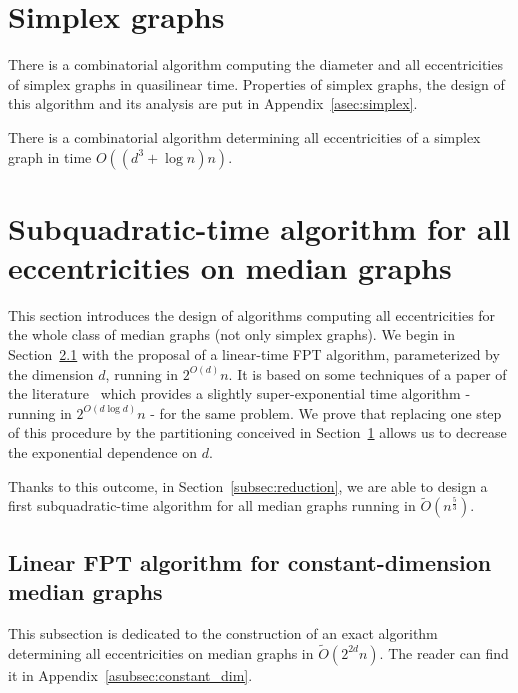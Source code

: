 \documentclass[a4paper,UKenglish,numberwithinsect,cleveref, autoref,anonymous]{lipics-v2021}
\begin{document}

\section{Simplex graphs} \label{sec:simplex}

There is a combinatorial algorithm computing the diameter and all eccentricities of simplex graphs in quasilinear time. Properties of simplex graphs, the design of this algorithm and its analysis are put in Appendix~\ref{asec:simplex}.

\begin{theorem}[\ref{co:linear_simplex}]
There is a combinatorial algorithm determining all eccentricities of a simplex graph in time $O((d^3+\log n)n)$.
\label{th:linear_simplex_teaser}
\end{theorem}

\section{Subquadratic-time algorithm for all eccentricities on median graphs} \label{sec:subquadratic}

This section introduces the design of algorithms computing all eccentricities for the whole class of  median graphs (not only simplex graphs). We begin in Section~\ref{subsec:constant_dim} with the proposal of a linear-time FPT algorithm, parameterized by the dimension $d$, running in $2^{O(d)}n$. It is based on some techniques of a paper of the literature~\cite{BeHa21} which provides a slightly super-exponential time algorithm - running in $2^{O(d\log d)}n$ - for the same problem. We prove that replacing one step of this procedure by the partitioning conceived in Section~\ref{sec:simplex} allows us to decrease the exponential dependence on $d$.

 Thanks to this outcome, in Section~\ref{subsec:reduction}, we are able to design a first subquadratic-time algorithm for all median graphs running in $\tilde{O}(n^{\frac{5}{3}})$.

\subsection{Linear FPT algorithm for constant-dimension median graphs} \label{subsec:constant_dim}

This subsection is dedicated to the construction of an exact algorithm determining all eccentricities on median graphs in $\tilde{O}(2^{2d}n)$. The reader can find it in Appendix~\ref{asubsec:constant_dim}.
\end{document}
